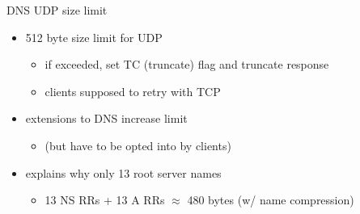 \begin{frame}{DNS UDP size limit}
    \begin{itemize}
    \item 512 byte size limit for UDP
        \begin{itemize}
        \item if exceeded, set TC (truncate) flag and truncate response
        \item clients supposed to retry with TCP
        \end{itemize}
    \item extensions to DNS increase limit
        \begin{itemize}
        \item (but have to be opted into by clients)
        \end{itemize}
    \item explains why only 13 root server names
        \begin{itemize}
        \item 13 NS RRs + 13 A RRs $\approx$ 480 bytes (w/ name compression)
        \end{itemize}
    \end{itemize}
\end{frame}

